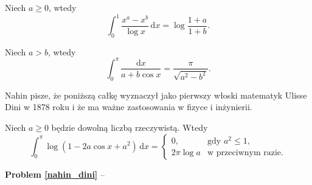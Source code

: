 \begin{problem}
    Niech $a \ge 0$, wtedy
    \begin{equation}
        \int_0^1 \frac{x^a - x^b}{\log x} \,\mathrm{d}x = \log \frac{1+a}{1+b}.
    \end{equation}
\end{problem}

\begin{problem}
    Niech $a > b$, wtedy
    \begin{equation}
        \int_0^\pi \frac{\mathrm{d}x} {a + b \cos x} = \frac{\pi}{\sqrt{a^2 - b^2}}.
    \end{equation}
\end{problem}

Nahin pisze, że poniższą całkę wyznaczył jako pierwszy włoski matematyk Ulisse Dini w 1878 roku i że ma ważne zastosowania w fizyce i inżynierii.
%

\begin{problem}
    \label{nahin_dini}%
    Niech $a \ge 0$ będzie dowolną liczbą rzeczywistą.
    Wtedy
    \begin{equation}
        \int_0^\pi \log (1 - 2 a \cos x + a^2) \,\mathrm{d} x = \begin{cases}
            0, & \text{gdy } a^2 \le 1, \\
            2 \pi \log a & \textrm{w przeciwnym razie}.
        \end{cases}
    \end{equation}
\end{problem}

\textbf{Problem \ref{nahin_dini}} -- \cite[s. 109-112]{nahin15} %

%